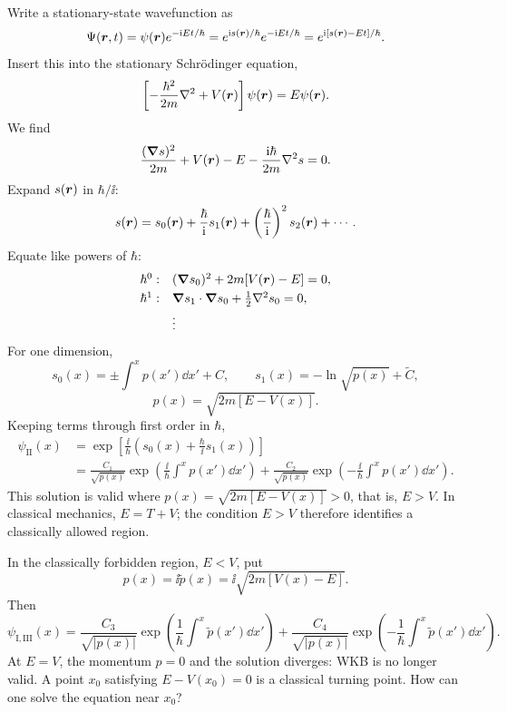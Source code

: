 Write a stationary-state wavefunction as
\begin{equation}
\Psi(\bm{r},t)=\psi(\bm{r})e^{-\mathrm{i} Et/\hbar}
=e^{\mathrm{i} s(\bm{r})/\hbar}e^{-\mathrm{i} Et/\hbar}
=e^{\mathrm{i}[s(\bm{r})-Et]/\hbar}.
\end{equation}
Insert this into the stationary Schr\"odinger equation,
\begin{equation}
\left[-\frac{\hbar^2}{2m}\nabla^2+V(\bm{r})\right]\psi(\bm{r})
=E\psi(\bm{r}).
\end{equation}
We find
\begin{equation}
\frac{(\bm{\nabla} s)^2}{2m}+V(\bm{r})-E
-\frac{\mathrm{i}\hbar}{2m}\nabla^2s=0.
\end{equation}
Expand $s(\bm{r})$ in $\hbar/\ii$:
\begin{equation}
s(\bm{r})=s_0(\bm{r})+\frac\hbar{\mathrm{i}} s_1(\bm{r})
+\left(\frac\hbar{\mathrm{i}}\right)^2s_2(\bm{r})+\cdots.
\end{equation}
Equate like powers of $\hbar$:
\begin{equation}
\begin{array}{ll}
\hbar^0:&(\bm{\nabla} s_0)^2+2m[V(\bm{r})-E]=0,\\[3pt]
\hbar^1:&\bm{\nabla} s_1\cdot\bm{\nabla} s_0+\frac12\nabla^2s_0=0,\\[3pt]
&\vdots
\end{array}
\end{equation}
For one dimension,
\begin{equation}
s_0(x)=\pm\int^x p(x')\dd x'+C,\qquad
s_1(x)=-\ln\sqrt{p(x)}+\widetilde C,
\end{equation}
\begin{equation}
\boxed{p(x)=\sqrt{2m[E-V(x)]}.}
\end{equation}
Keeping terms through first order in $\hbar$,
\begin{equation}
\begin{split}
\psi_{\mathrm{II}}(x)
&=\exp\left[\frac\ii\hbar\left(s_0(x)+\frac\hbar\ii s_1(x)\right)\right]\\
&=\frac{C_1}{\sqrt{p(x)}}\exp\left(\frac\ii\hbar\int^xp(x')\dd x'\right)
+\frac{C_2}{\sqrt{p(x)}}\exp\left(-\frac\ii\hbar\int^xp(x')\dd x'\right).
\end{split}
\end{equation}
This solution is valid where $p(x)=\sqrt{2m[E-V(x)]}>0$, that is, $E>V$. In classical mechanics, $E=T+V$; the condition $E>V$ therefore identifies a classically allowed region.

In the classically forbidden region, $E<V$, put
\begin{equation}
p(x)=\ii\widetilde p(x)=\ii\sqrt{2m[V(x)-E]}.
\end{equation}
Then
\begin{equation}
\psi_{\mathrm{I,III}}(x)
=\frac{C_3}{\sqrt{|p(x)|}}\exp\left(\frac1\hbar\int^x\widetilde p(x')\dd x'\right)
+\frac{C_4}{\sqrt{|p(x)|}}\exp\left(-\frac1\hbar\int^x\widetilde p(x')\dd x'\right).
\end{equation}
At $E=V$, the momentum $p=0$ and the solution diverges: WKB is no longer valid. A point $x_0$ satisfying $E-V(x_0)=0$ is a classical turning point. How can one solve the equation near $x_0$?

